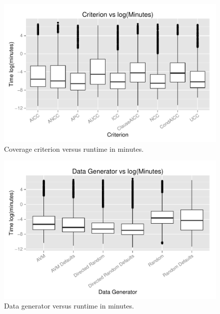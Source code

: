 \begin{figure}
\centering
  \centering
  \includegraphics[width=1\linewidth]{diagrams/CriterionvsTime.pdf}
  \caption{Coverage criterion versus runtime in minutes.\vspace{-.15in}}
  \label{fig:crites}
  \vspace{-.15in} 
\end{figure}

\begin{figure}
\centering
  \centering
  \includegraphics[width=1\linewidth]{diagrams/DataGeneratorvsTime.pdf}
  \caption{Data generator versus runtime in minutes.\vspace{-.15in}}
  \label{fig:datas}
  \vspace{-.15in} 
\end{figure}


